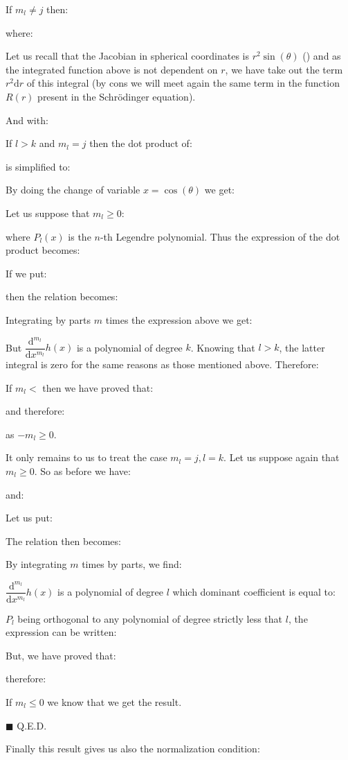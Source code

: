 	\begin{dem}
	If $m_l\neq j$ then:
	
	where:
	
	\begin{tcolorbox}[title=Remark,arc=10pt,breakable,drop lifted shadow,
  skin=enhanced,
  skin first is subskin of={enhancedfirst}{arc=10pt,no shadow},
  skin middle is subskin of={enhancedmiddle}{arc=10pt,no shadow},
  skin last is subskin of={enhancedlast}{drop lifted shadow}]
	Let us recall that the Jacobian in spherical coordinates is $r^2\sin(\theta)$ () and as the integrated function above is not dependent on $r$, we have take out the term $r^2\mathrm{d}r$ of this integral (by cons we will meet again the same term in the function $R(r)$ present in the Schrödinger equation).
	\end{tcolorbox}
	And with:
	
	If $l>k$ and $m_l=j$ then the dot product of:
	
	is simplified to:
	
	By doing the change of variable $x=\cos(\theta)$ we get:
	
	Let us suppose that $m_l\geq 0$:
	
	where $P_l(x)$ is the $n$-th Legendre polynomial. Thus the expression of the dot product becomes:
	
	If we put:
	
	then the relation becomes:
	
	Integrating by parts $m$ times the expression above we get:
	
	But $\dfrac{\mathrm{d}^{m_l}}{\mathrm{d}x^{m_l}}h(x)$ is a polynomial of degree $k$. Knowing that $l>k$, the latter integral is zero for the same reasons as those mentioned above. Therefore:
	
	If $m_l<$ then we have proved that:
	
	and therefore:
	
	as $-m_l\geq 0$.
	
	It only remains to us to treat the case $m_l=j,l=k$. Let us suppose again that $m_l\geq 0$. So as before we have:
	
	and:
	
	Let us put:
	
	The relation then becomes:
	
	By integrating $m$ times by parts, we find:
	
	$\dfrac{\mathrm{d} ^{m_l}}{\mathrm{d} x^{m_l}}h(x)$ is a polynomial of degree $l$ which dominant coefficient is equal to:
	
	$P_l$ being orthogonal to any polynomial of degree strictly less that $l$, the expression can be written:
	
	But, we have proved that:
	
	therefore:
	
	If $m_l\leq 0$ we know that we get the result.
	\begin{flushright}
		$\blacksquare$  Q.E.D.
	\end{flushright}
	\end{dem}
	Finally this result gives us also the normalization condition:
	
